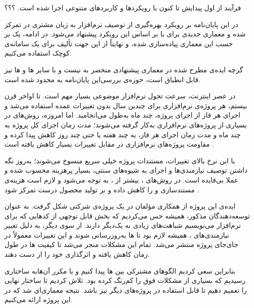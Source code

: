 	
فرآیند  از اول پیدایش تا کنون با رویکرد‌ها و کاربردهای
متنوعی اجرا شده است. ؟؟؟

در این پایان‌نامه بر رویکرد بهره‌گیری از توصیف
نرم‌افزار به زبان مشتری در  تمرکز شده و معماری‌ جدیدی برای
 با   بر اساس این رویکرد پیشنهاد می‌شود.
در ادامه، یک   بر
حسب این معماری پیاده‌سازی شده، و نهایتاً از این  جهت تألیف
 برای یک سامانه‌ی کوچک استفاده می‌کنیم.

گرچه ایده‌ی مطرح شده در معماری پیشنهادی منحصر به 
 نیست و با سایر ‌ها و ‌ها نیز
قابل انطباق است، حوزه‌ی بررسی‌این پایان‌نامه به 
 محدود شده است.

در عصر اینترنت، سرعت تحول نرم‌افزار موضوعی بسیار مهم است. تا اواخر قرن
بیستم، هر پروژه‌ی نرم‌افزاری برای چندین سال بدون تغییرات عمده استفاده
می‌شد و اجرای هر فاز از اجرای پروژه، چند ماه به‌طول می‌انجامید. اما
امروزه، روش‌های  در بسیاری از پروژه‌های نرم‌افزاری به‌کار
گرفته می‌شوند؛ مدت زمان اجرای کل پروژه به چند ماه و مدت زمان اجرای هر
فاز، به چند هفته یا حتی چند روز کاهش پیدا کرده و مقاومت پروژه‌های
نرم‌افزاری در مقابل تغییرات بسیار کاهش یافته است .

با این نرخ بالای تغییرات، مستندات پروژه خیلی سریع منسوخ می‌شوند؛ به‌روز
نگه داشتن توصیف نیازمندی‌ها و اجرای  به شیوه‌های سنتی، بسیار
پرهزینه محسوب شده و عملا بی‌فایده است. در روش‌های ،
بیشتر از ، به
 توجه می‌شود و لازم
است هزینه‌ی مستندسازی و  را کاهش داده و بر تولید محصول درست
تمرکز شود . 

ایده‌ی این پروژه از همکاری مؤلفان در یک پروژه‌ی شرکتی شکل گرفت. به عنوان توسعه‌دهندگان  مذکور، همیشه حس می‌کردیم که بخش قابل توجهی از کدهایی که برای  نرم‌افزار می‌نویسیم شباهت‌های زیادی به یک‌دیگر دارند.
از سوی دیگر، به دلیل تغییر نیازمندی‌های ، همیشه لازم بود تا ‌ها به‌روزرسانی شوند و این تغییرات معمولاً در جای‌جای پروژه منتشر می‌شد. تمام این مشکلات منجر می‌شد تا کیفیت ‌ها در طول زمان کاهش یافته و اثرگذاری خود را از دست دهند.

بنابراین سعی کردیم الگوهای مشترکی بین ‌ها پیدا کنیم و با  مکرر آن‌هابه ساختاری رسیدیم که بسیاری از مشکلات فوق را کم‌رنگ کرده بود. تلاش کردیم تا ساختار نهایی را تعمیم دهیم تا قابل استفاده در پروژه‌های دیگر نیز باشد. نتیجه معماری‌ای شد که در این پروژه ارائه می‌کنیم.


